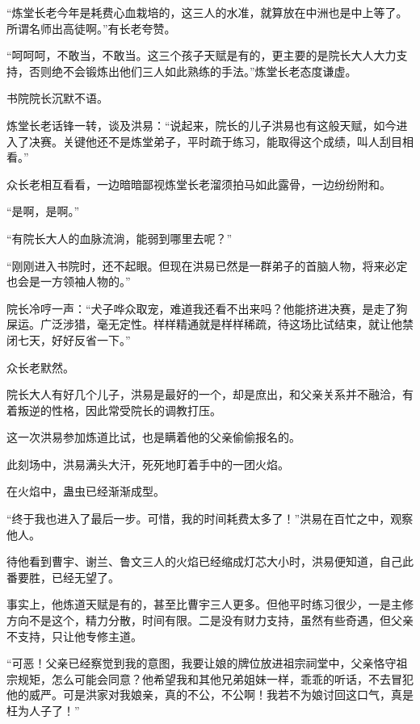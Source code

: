 
\begin{this_body}

“炼堂长老今年是耗费心血栽培的，这三人的水准，就算放在中洲也是中上等了。所谓名师出高徒啊。”有长老夸赞。

“呵呵呵，不敢当，不敢当。这三个孩子天赋是有的，更主要的是院长大人大力支持，否则绝不会锻炼出他们三人如此熟练的手法。”炼堂长老态度谦虚。

书院院长沉默不语。

炼堂长老话锋一转，谈及洪易：“说起来，院长的儿子洪易也有这般天赋，如今进入了决赛。关键他还不是炼堂弟子，平时疏于练习，能取得这个成绩，叫人刮目相看。”

众长老相互看看，一边暗暗鄙视炼堂长老溜须拍马如此露骨，一边纷纷附和。

“是啊，是啊。”

“有院长大人的血脉流淌，能弱到哪里去呢？”

“刚刚进入书院时，还不起眼。但现在洪易已然是一群弟子的首脑人物，将来必定也会是一方领袖人物的。”

院长冷哼一声：“犬子哗众取宠，难道我还看不出来吗？他能挤进决赛，是走了狗屎运。广泛涉猎，毫无定性。样样精通就是样样稀疏，待这场比试结束，就让他禁闭七天，好好反省一下。”

众长老默然。

院长大人有好几个儿子，洪易是最好的一个，却是庶出，和父亲关系并不融洽，有着叛逆的性格，因此常受院长的调教打压。

这一次洪易参加炼道比试，也是瞒着他的父亲偷偷报名的。

此刻场中，洪易满头大汗，死死地盯着手中的一团火焰。

在火焰中，蛊虫已经渐渐成型。

“终于我也进入了最后一步。可惜，我的时间耗费太多了！”洪易在百忙之中，观察他人。

待他看到曹宇、谢兰、鲁文三人的火焰已经缩成灯芯大小时，洪易便知道，自己此番要胜，已经无望了。

事实上，他炼道天赋是有的，甚至比曹宇三人更多。但他平时练习很少，一是主修方向不是这个，精力分散，时间有限。二是没有财力支持，虽然有些奇遇，但父亲不支持，只让他专修主道。

“可恶！父亲已经察觉到我的意图，我要让娘的牌位放进祖宗祠堂中，父亲恪守祖宗规矩，怎么可能会同意？他希望我和其他兄弟姐妹一样，乖乖的听话，不去冒犯他的威严。可是洪家对我娘亲，真的不公，不公啊！我若不为娘讨回这口气，真是枉为人子了！”


\end{this_body}
